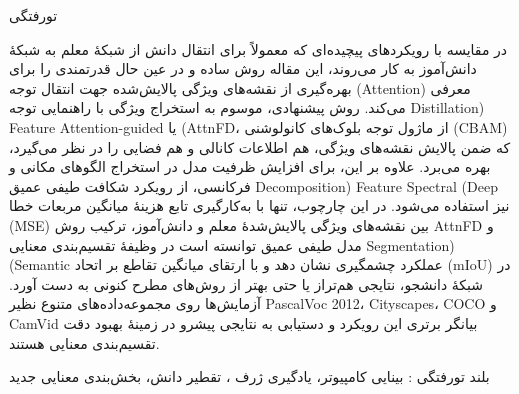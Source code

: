 

\vspace*{-60pt}
\enlargethispage{90pt}


\vspace{-1cm}

‌تورفتگی

در مقایسه با رویکردهای پیچیده‌ای که معمولاً برای انتقال دانش از شبکهٔ معلم به شبکهٔ دانش‌آموز به کار می‌روند، این مقاله روش ساده و در عین حال قدرتمندی را برای بهره‌گیری از نقشه‌های ویژگی پالایش‌شده جهت انتقال توجه (Attention) معرفی می‌کند. روش پیشنهادی، موسوم به استخراج ویژگی با راهنمایی توجه Distillation) Feature Attention-guided یا (AttnFD، از ماژول توجه بلوک‌های کانولوشنی (CBAM) که ضمن پالایش نقشه‌های ویژگی، هم اطلاعات کانالی و هم فضایی را در نظر می‌گیرد، بهره می‌برد. علاوه بر این، برای افزایش ظرفیت مدل در استخراج الگوهای مکانی و فرکانسی، از رویکرد شکافت طیفی عمیق Decomposition) Feature Spectral (Deep نیز استفاده می‌شود. در این چارچوب، تنها با به‌کارگیری تابع هزینهٔ میانگین مربعات خطا (MSE) بین نقشه‌های ویژگی پالایش‌شدهٔ معلم و دانش‌آموز، ترکیب روش AttnFD و مدل طیفی عمیق توانسته است در وظیفهٔ تقسیم‌بندی معنایی Segmentation) (Semantic عملکرد چشمگیری نشان دهد و با ارتقای میانگین تقاطع بر اتحاد (mIoU) در شبکهٔ دانشجو، نتایجی هم‌تراز یا حتی بهتر از روش‌های مطرح کنونی به دست آورد. آزمایش‌ها روی مجموعه‌داده‌های متنوع نظیر PascalVoc 2012، Cityscapes، COCO و CamVid بیانگر برتری این رویکرد و دستیابی به نتایجی پیشرو در زمینهٔ بهبود دقت تقسیم‌بندی معنایی هستند.

‌بلند
‌تورفتگی : 
بینایی کامپیوتر، یادگیری ژرف ، تقطیر دانش، بخش‌بندی معنایی 
‌جدید
